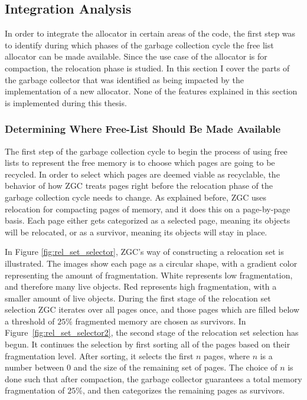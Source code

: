 \subsection{Integration Analysis}
In order to integrate the allocator in certain areas of the code, the first step was to identify during which phases of the garbage collection cycle the free list allocator can be made available. Since the use case of the allocator is for compaction, the relocation phase is studied. In this section I cover the parts of the garbage collector that was identified as being impacted by the implementation of a new allocator. None of the features explained in this section is implemented during this thesis.

\subsubsection{Determining Where Free-List Should Be Made Available}
\label{sec:analyse-select}
The first step of the garbage collection cycle to begin the process of using free lists to represent the free memory is to choose which pages are going to be recycled. In order to select which pages are deemed viable as recyclable, the behavior of how ZGC treats pages right before the relocation phase of the garbage collection cycle needs to change. As explained before, ZGC uses relocation for compacting pages of memory, and it does this on a page-by-page basis. Each page either gets categorized as a selected page, meaning its objects will be relocated, or as a survivor, meaning its objects will stay in place. 

In Figure \ref{fig:rel_set_selector}, ZGC's way of constructing a relocation set is illustrated. The images show each page as a circular shape, with a gradient color representing the amount of fragmentation. White represents low fragmentation, and therefore many live objects. Red represents high fragmentation, with a smaller amount of live objects. During the first stage of the relocation set selection ZGC iterates over all pages once, and those pages which are filled below a threshold of $25\%$ fragmented memory are chosen as survivors. In Figure~\ref{fig:rel_set_selector2}, the second stage of the relocation set selection has begun. It continues the selection by first sorting all of the pages based on their fragmentation level. After sorting, it selects the first $n$ pages, where $n$ is a number between 0 and the size of the remaining set of pages. The choice of $n$ is done such that after compaction, the garbage collector guarantees a total memory fragmentation of $25\%$, and then categorizes the remaining pages as survivors.

